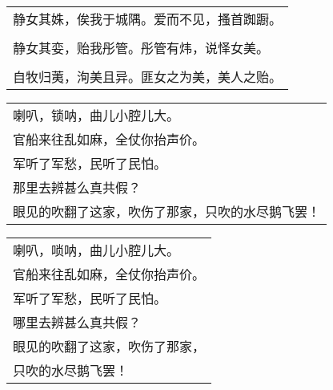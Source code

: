 \nopagebreak%
\nopagebreak%
\noindent\begin{minipage}{\linewidth}
  \vskip-3pt\begin{table}[H]
    \centering
    \begin{tabular}{@{}l@{}}
静女其姝，俟我于城隅。爱而不见，搔首踟蹰。\\
\\
静女其娈，贻我彤管。彤管有炜，说怿女美。\\
\\
自牧归荑，洵美且异。匪女之为美，美人之贻。
    \end{tabular}
  \end{table}
\end{minipage}
\vspace{1cm}


\nopagebreak%
\nopagebreak%
\noindent\begin{minipage}{\linewidth}
  \vskip-3pt\begin{table}[H]
    \centering
    \begin{tabular}{@{}l@{}}
喇叭，锁呐，曲儿小腔儿大。\\
官船来往乱如麻，全仗你抬声价。\\
军听了军愁，民听了民怕。\\
那里去辨甚么真共假？\\
眼见的吹翻了这家，吹伤了那家，只吹的水尽鹅飞罢！
    \end{tabular}
  \end{table}
\end{minipage}
\vspace{1cm}


\nopagebreak%
\nopagebreak%
\noindent\begin{minipage}{\linewidth}
  \vskip-3pt\begin{table}[H]
    \centering
    \begin{tabular}{@{}l@{}}
喇叭，唢呐，曲儿小腔儿大。\\
官船来往乱如麻，全仗你抬声价。\\
军听了军愁，民听了民怕。\\
哪里去辨甚么真共假？\\
眼见的吹翻了这家，吹伤了那家，\\
只吹的水尽鹅飞罢！
    \end{tabular}
  \end{table}
\end{minipage}
\vspace{1cm}


